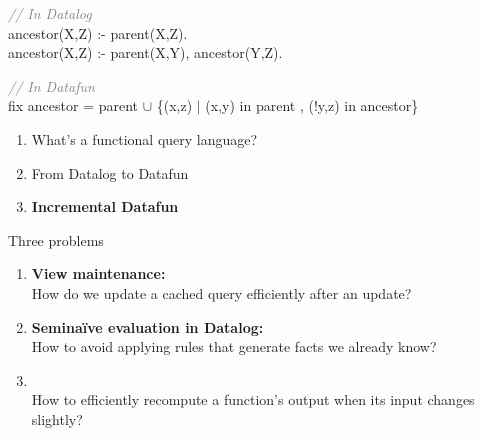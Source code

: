 \documentclass[xcolor=table,usenames,dvipsnames,svgnames]{beamer}
\newcommand{\df}{\color{RoyalBlue}}
\begin{document}

\begin{frame}
  \Large

  \textcolor{gray}{\it // In Datalog}\\
  ancestor(X,Z) :- parent(X,Z).\\
  ancestor(X,Z) :- parent(X,Y), ancestor(Y,Z).

  \pause\vspace{2em}\df

  \textcolor{gray}{\it // In Datafun}\\
  fix ancestor = parent\newline
  \phantom{fix ancestor}
  $\cup$ \{(x,z) $\mid$ (x,y) in parent\newline
  , (!y,z) in ancestor\}
\end{frame}



\begin{frame}\end{frame}
%


\begin{frame}\Large
  \begin{enumerate}\color{gray}\itemsep 1.5em
  \item What's a functional query language?
  \item From Datalog to Datafun
  \item {\color{black}\bf Incremental Datafun}
  \end{enumerate}
\end{frame}


\begin{frame}{Three problems}\large
  \begin{enumerate}\itemsep 1em
  \item {\bf View maintenance:} \\
    {\normalsize How do we update a cached query efficiently after an update?}\
    \pause
  \item {\bf Semina\"ive evaluation in Datalog:}\\
    {\normalsize How to avoid applying rules that generate facts we already know?}
    \pause
  \item \color{black}{\bf Incremental computation:}\\
    {\normalsize How to efficiently recompute a
    function's output when its input changes slightly?}
  \end{enumerate}
\end{frame}
\end{document}
